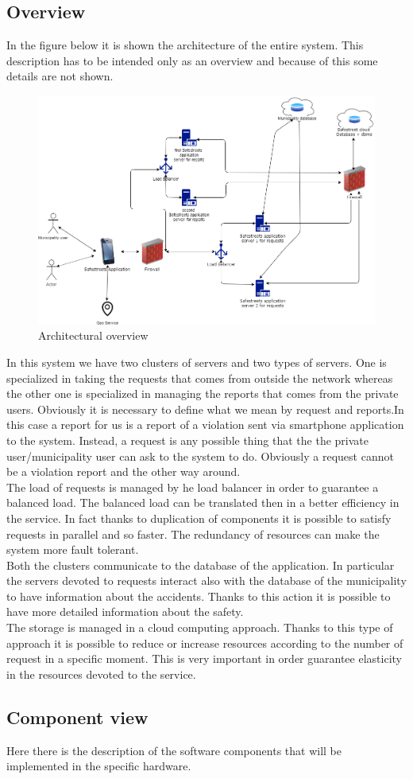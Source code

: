 \documentclass[titlepage]{article}
\begin{document}
\subsection{Overview}
In the figure below it is shown the architecture of the entire system. This description has to be intended only as an overview and because of this some details are not shown.
\begin{figure}[h]
	\includegraphics[scale=0.465]{Diagrams/overview.png}
	\caption{Architectural overview}
\end{figure}
\FloatBarrier In this system we have two clusters of servers and two types of servers. One is specialized in taking the requests that comes from outside the network whereas the other one is specialized in managing the reports that comes from the private users. Obviously it is necessary to define what we mean by request and reports.In this case a report for us is a report of a violation sent via smartphone application to the system. Instead, a request is any possible thing that the the private user/municipality user can ask to the system to do. Obviously a request cannot be a violation report and the other way around.\\
 The load of requests is managed by  he load balancer in order to guarantee a balanced load. The balanced load can be translated then in a better efficiency in the service. In fact thanks to duplication of components it is possible to satisfy requests in parallel and so faster. The redundancy of resources can make the system more fault tolerant.\\
 Both the clusters communicate to the database of the application. In particular the servers devoted to requests interact also with the database of the municipality to have information about the accidents. Thanks to this action it is possible to have more detailed information about the safety.\\
The storage is managed in a cloud computing approach. Thanks to this type of approach it is possible to reduce or increase resources according to the number of request in a specific moment. This is very important in order guarantee elasticity in the resources devoted to the service.\\ 

\subsection{Component view}
Here there is the description of the software components that will be implemented in the specific hardware.
\end{document}
